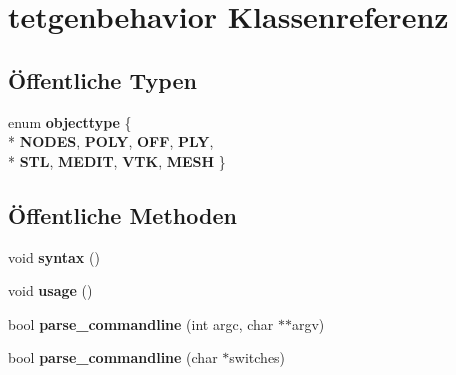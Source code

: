 \hypertarget{classtetgenbehavior}{\section{tetgenbehavior Klassenreferenz}
\label{classtetgenbehavior}
}
\subsection*{Öffentliche Typen}
\begin{DoxyCompactItemize}
\item 
enum {\bfseries objecttype} \{ \\*
{\bfseries N\-O\-D\-E\-S}, 
{\bfseries P\-O\-L\-Y}, 
{\bfseries O\-F\-F}, 
{\bfseries P\-L\-Y}, 
\\*
{\bfseries S\-T\-L}, 
{\bfseries M\-E\-D\-I\-T}, 
{\bfseries V\-T\-K}, 
{\bfseries M\-E\-S\-H}
 \}
\end{DoxyCompactItemize}
\subsection*{Öffentliche Methoden}
\begin{DoxyCompactItemize}
\item 
\hypertarget{classtetgenbehavior_a6e22cb6ec468a3b0a5fc45fcb4d9709c}{void {\bfseries syntax} ()}\label{classtetgenbehavior_a6e22cb6ec468a3b0a5fc45fcb4d9709c}

\item 
\hypertarget{classtetgenbehavior_aa0bf59fe9ca35269d58e5f1ee10aca05}{void {\bfseries usage} ()}\label{classtetgenbehavior_aa0bf59fe9ca35269d58e5f1ee10aca05}

\item 
\hypertarget{classtetgenbehavior_a240b6eb4bee021fc945ca8b01f7b7b9f}{bool {\bfseries parse\-\_\-commandline} (int argc, char $\ast$$\ast$argv)}\label{classtetgenbehavior_a240b6eb4bee021fc945ca8b01f7b7b9f}

\item 
\hypertarget{classtetgenbehavior_abf5ad80b5b6900296253c6126f667fe2}{bool {\bfseries parse\-\_\-commandline} (char $\ast$switches)}\label{classtetgenbehavior_abf5ad80b5b6900296253c6126f667fe2}

\end{DoxyCompactItemize}
